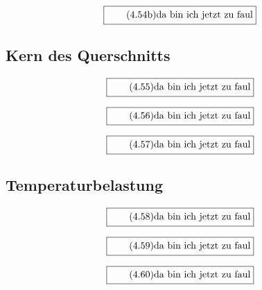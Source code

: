 \documentclass[11pt]{article}
\newcommand{\1}{ {\mathds{1}} }
\begin{document}
		\begin{equation}
			\boxed{
				\tag{4.54b}
				\begin{split}
					\text{da bin ich jetzt zu faul}
				\end{split}
			}
		\end{equation}
		
		\subsection{Kern des Querschnitts}

		\begin{equation}
			\boxed{
				\tag{4.55}
				\begin{split}
					\text{da bin ich jetzt zu faul}
				\end{split}
			}
		\end{equation}
		
		\begin{equation}
			\boxed{
				\tag{4.56}
				\begin{split}
					\text{da bin ich jetzt zu faul}
				\end{split}
			}
		\end{equation}

		\begin{equation}
			\boxed{
				\tag{4.57}
				\begin{split}
					\text{da bin ich jetzt zu faul}
				\end{split}
			}
		\end{equation}
		\subsection{Temperaturbelastung}

		\begin{equation}
			\boxed{
				\tag{4.58}
				\begin{split}
					\text{da bin ich jetzt zu faul}
				\end{split}
			}
		\end{equation}
		
		\begin{equation}
			\boxed{
				\tag{4.59}
				\begin{split}
					\text{da bin ich jetzt zu faul}
				\end{split}
			}
		\end{equation}

		\begin{equation}
			\boxed{
				\tag{4.60}
				\begin{split}
					\text{da bin ich jetzt zu faul}
				\end{split}
			}
		\end{equation}
\end{document}
